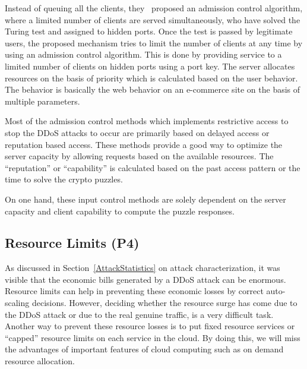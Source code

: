\documentclass[final,5p,times,twocolumn]{elsarticle}
\begin{document}
Instead of queuing all the clients, they~\cite{edosarmor} proposed an admission control algorithm, where a limited number of clients are served simultaneously, who have solved the Turing test and assigned to hidden ports. Once the test is passed by legitimate users, the proposed mechanism tries to limit the number of clients at any time by using an admission control algorithm. This is done by providing service to a limited number of clients on hidden ports using a port key.  The server allocates resources on the basis of priority which is calculated based on the user behavior. The behavior is basically the web behavior on an e-commerce site on the basis of multiple parameters. 

{Most of the admission control methods which implements restrictive access to stop the DDoS attacks to occur are primarily based on delayed access or reputation based access. These methods provide a good way to optimize the server capacity by allowing requests based on the available resources. The ``reputation'' or ``capability'' is calculated based on the past access pattern or the time to solve the crypto puzzles.} 

{On one hand, these input control methods are solely dependent on the server capacity and client capability to compute the puzzle responses.} 


\subsection{ Resource Limits (P4)}
{As discussed in Section~\ref{AttackStatistics} on attack characterization, it was visible that the economic bills generated by a DDoS attack can be enormous. Resource limits can help in preventing these economic losses by correct auto-scaling decisions. However, deciding whether the resource surge has come due to the DDoS attack or due to the real genuine traffic, is a very difficult task. Another way to prevent these resource losses is to put fixed resource services or ``capped'' resource limits on each service in the cloud. By doing this, we will miss the advantages of important features of cloud computing such as  on demand resource allocation. }
\end{document}
